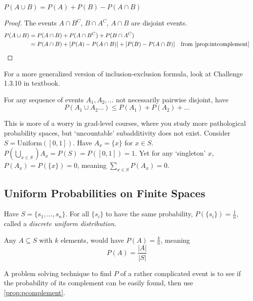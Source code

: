 \begin{simplethm}
    $P(A \cup B) = P(A) + P(B) - P(A \cap B)$
\end{simplethm}
\begin{proof}
The events $A \cap B^C$, $B \cap A^C$, $A \cap B$ are disjoint events. 
\begin{align*}
    P(A \cup B) &= P(A \cap B) + P(A \cap B^C) + P(B \cap A^C) \\
    &= P(A \cap B) + [P(A) - P(A \cap B)] + [P(B) - P(A \cap B)] & \text{from } \ref{prop:intcomplement}
\end{align*}
\end{proof}
\noindent For a more generalized version of inclusion-exclusion formula, look at Challenge 1.3.10 in textbook.

\begin{simplethm}[Subadditivity]
For any sequence of events $A_1, A_2, \dots$ not necessarily pairwise disjoint, have
\[
    P(A_1 \cup A_2 \dots) \leq P(A_1) + P(A_2) + \dots
\]
\end{simplethm}

\begin{remark}
    This is more of a worry in grad-level courses, where you study more pathological probability spaces, but `uncountable' subadditivity does not exist. Consider $S = \text{Uniform}([0, 1])$. Have $A_x = \{ x \}$ for $x \in S$. $P(\bigcup_{x \in S}) A_x = P(S) = P([0, 1]) = 1$. Yet for any `singleton' $x$, $P(A_x) = P(\{ x \}) = 0$, meaning $\sum_{x \in S} P(A_x) = 0$.
\end{remark}

\newpage

\subsection{Uniform Probabilities on Finite Spaces}
Have $S = \{ s_1, \dots ,s_n \}$. For all $\{ s_i \}$ to have the same probability, $P(\{ s_i \}) = \frac{1}{n}$, called a \textit{discrete uniform distribution}. 

Any $A \subseteq S$ with $k$ elements, would have $P(A) = \frac{k}{n}$, meaning
\[
P(A) = \frac{|A|}{|S|}
\]

A problem solving technique to find $P$ of a rather complicated event is to see if the probability of its complement can be easily found, then use \ref{prop:pcomplement}.
